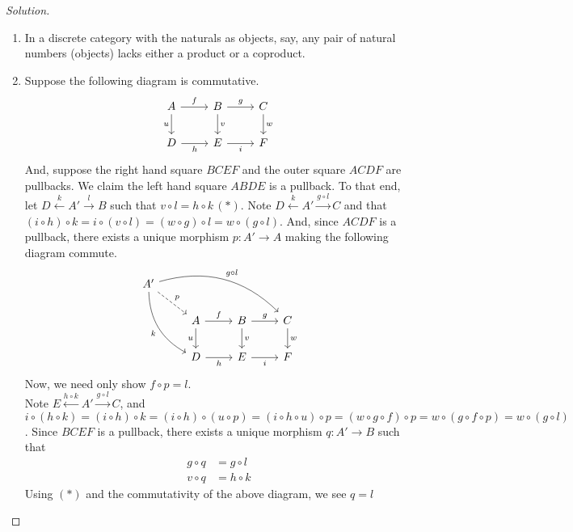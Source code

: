 \documentclass[]{amsbook}
\newcommand{\0}{\mathbf{0}}
\newcommand{\1}{\mathbf{1}}
\newenvironment{solution}
    {\begin{proof}[Solution]}{\end{proof}}
\begin{document}
\begin{solution}
\leavevmode
\begin{enumerate}
    \item In a discrete category with the naturals as objects, say, any pair
    of natural numbers (objects) lacks either a product or a coproduct.

    \item Suppose the following diagram is commutative.
    \[
    \begin{tikzcd}
    A \arrow[r, "f"]
      \arrow[d, swap, "u"]
      & B \arrow[r, "g"]
          \arrow[d, "v"]
      & C \arrow[d, "w"] \\
    D \arrow[r, swap, "h"]
      & E \arrow[r, swap, "i"]
      & F
    \end{tikzcd}
    \]
    And, suppose the right hand square $BCEF$ and the outer square $ACDF$ are
    pullbacks. We claim the left hand square $ABDE$ is a pullback. To that end,
    let $D \xleftarrow{k} A' \xrightarrow{l} B$ such that $v \circ l = h \circ
    k \, (\ast)$. Note $D \xleftarrow{k} A' \xrightarrow{g \circ l} C$ and that
    $(i \circ h) \circ k = i \circ (v \circ l) = (w \circ g) \circ l = w \circ
    (g \circ l)$. And, since $ACDF$ is a pullback, there exists a unique
    morphism $p : A' \to A$ making the following diagram commute.
    \[
    \begin{tikzcd}
        A' \arrow[ddr, swap, bend right, "k"]
           \arrow[drrr, bend left, "g \circ l"]
           \arrow[dr, dashed, "p"]
           & & & \\
        & A \arrow[r, "f"]
            \arrow[d, swap, "u"]
        & B \arrow[r, "g"]
            \arrow[d, "v"]
        & C \arrow[d, "w"] \\
        & D \arrow[r, swap, "h"]
        & E \arrow[r, swap, "i"]
        & F
    \end{tikzcd}
    \]
    Now, we need only show $f \circ p = l$.\\
    Note $E \xleftarrow{h \circ k} A' \xrightarrow{g \circ l} C$, and $i \circ
    (h \circ k) = (i \circ h) \circ k = (i \circ h) \circ (u \circ p) = (i
    \circ h \circ u) \circ p = (w \circ g \circ f) \circ p = w \circ (g \circ
    f \circ p) = w \circ (g \circ l)$. Since $BCEF$ is a pullback, there exists
    a unique morphism $q : A' \to B$ such that
    \begin{align*}
        g \circ q &= g \circ l \\
        v \circ q &= h \circ k
    \end{align*}
    Using $(\ast)$ and the commutativity of the above diagram, we see $q = l$

\end{enumerate}
\end{solution}
\end{document}
